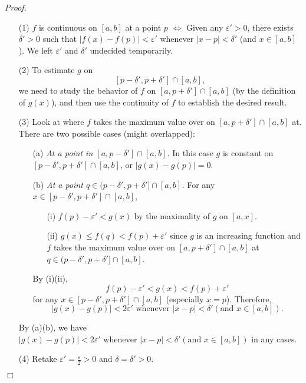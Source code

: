 \documentclass{article}
\begin{document}
\emph{Proof.}
\begin{enumerate}
\item[(1)]
$f$ is continuous on $[a,b]$ at a point $p$ $\Longleftrightarrow$
Given any $\varepsilon' > 0$, there exists $\delta' > 0$ such that
$|f(x) - f(p)| < \varepsilon'$ whenever $|x-p| < \delta'$ (and $x \in [a,b]$).
We left $\varepsilon'$ and $\delta'$ undecided temporarily.
\item[(2)]
To estimate $g$ on
$$[p-\delta', p+\delta'] \cap [a,b],$$
we need to study the behavior of $f$ on $[a,p+\delta'] \cap [a,b]$
(by the definition of $g(x)$),
and then use the continuity of $f$ to establish the desired result.
\item[(3)]
Look at where $f$ takes the maximum value over on $[a,p+\delta'] \cap [a,b]$ at.
There are two possible cases (might overlapped):
  \begin{enumerate}
  \item[(a)]
  \emph{At a point in $[a,p-\delta'] \cap [a,b]$.}
  In this case $g$ is constant on $[p-\delta', p+\delta'] \cap [a,b]$,
  or $|g(x) - g(p)| = 0$.
  \item[(b)]
  \emph{At a point $q \in (p-\delta',p+\delta'] \cap [a,b]$.}
  For any $x \in [p-\delta', p+\delta'] \cap [a,b]$,
    \begin{enumerate}
    \item[(i)]
    $f(p) - \varepsilon' < g(x)$ by the maximality of $g$ on $[a,x]$.
    \item[(ii)]
    $g(x) \leq f(q) < f(p) + \varepsilon'$
    since $g$ is an increasing function and
    $f$ takes the maximum value over on $[a,p+\delta'] \cap [a,b]$ at
    $q \in (p-\delta',p+\delta'] \cap [a,b]$.
    \end{enumerate}
  By (i)(ii),
  $$f(p) - \varepsilon' < g(x) < f(p) + \varepsilon'$$
  for  any $x \in [p-\delta', p+\delta'] \cap [a,b]$ (especially $x = p$).
  Therefore,
  $$|g(x) - g(p)| < 2 \varepsilon'
  \text{ whenever } |x-p| < \delta' (\text{and } x \in [a,b]).$$

  \end{enumerate}
  By (a)(b), we have
  $|g(x) - g(p)| < 2 \varepsilon'
  \text{ whenever } |x-p| < \delta' (\text{and } x \in [a,b])$ in any cases.
\item[(4)]
Retake $\varepsilon' = \frac{\varepsilon}{2} > 0$ and $\delta = \delta' > 0$.
\end{enumerate}
$\Box$ \\\\
\end{document}
